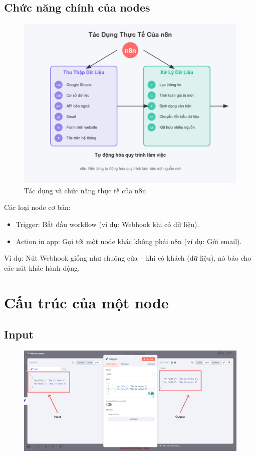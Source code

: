 \newpage

\subsection{Chức năng chính của nodes}

\begin{figure}[htbp]
    \centering
    \includegraphics[width=1\linewidth]{Chap1-7/a.pdf}
    \caption{Tác dụng và chức năng thực tế của n8n}
\end{figure}

Các loại node cơ bản:
\begin{itemize}
    \item Trigger: Bắt đầu workflow (ví dụ: Webhook khi có dữ liệu).
    \item Action in app: Gọi tới một node khác không phải n8n (ví dụ: Gửi email).
\end{itemize}
Ví dụ: Nút Webhook giống như chuông cửa – khi có khách (dữ liệu), nó báo cho các nút khác hành động.

\newpage
\section{Cấu trúc của một node}


\subsection{Input}

\begin{figure}[htbp]
    \centering
    \includegraphics[width=1\linewidth]{Chap1-7/input-ouput.pdf}
\end{figure}

